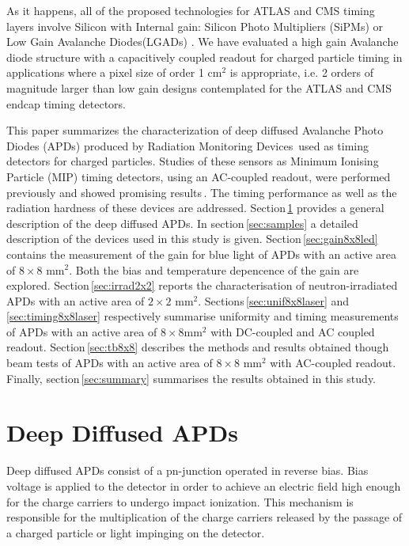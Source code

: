 \documentclass{article}
\begin{document}
As it happens, all of the proposed technologies for ATLAS and CMS timing layers involve Silicon with Internal gain: Silicon Photo Multipliers (SiPMs) or Low Gain Avalanche Diodes(LGADs) \cite{cmsMIPtiming,atlasMIPtiming}. We have evaluated a high gain Avalanche diode structure with a capacitively coupled readout for charged particle timing in applications where a pixel size of order 1 cm$^{2}$ is appropriate, i.e. 2 orders of magnitude larger than low gain designs contemplated for the ATLAS and CMS endcap timing detectors.

This paper summarizes the characterization of deep diffused Avalanche Photo Diodes (APDs) produced by Radiation Monitoring Devices\,\cite{rmdAddress} used as timing detectors for charged particles.
Studies of these sensors as Minimum Ionising Particle (MIP) timing detectors, using an AC-coupled readout, were performed previously and showed promising results\,\cite{white2014}.
The timing performance as well as the radiation hardness of these devices are addressed.
Section\,\ref{sec:ddApds} provides a general description of the deep diffused APDs.
In section\,\ref{sec:samples} a detailed description of the devices used in this study is given.
Section\,\ref{sec:gain8x8led} contains the measurement of the gain for blue light of APDs with an active area of $8 \times 8$ mm$^2$. Both the bias and temperature depencence of the gain are explored.
Section\,\ref{sec:irrad2x2} reports the characterisation of neutron-irradiated APDs with an active area of $2 \times 2$ mm$^2$.
Sections\,\ref{sec:unif8x8laser} and\,\ref{sec:timing8x8laser} respectively summarise uniformity and timing measurements of APDs with an active area of $8 \times 8$mm$^2$ with DC-coupled and AC coupled readout.
Section\,\ref{sec:tb8x8} describes the methods and results obtained though beam tests of APDs with an active area of $8 \times 8$ mm$^2$ with AC-coupled readout.
Finally, section\,\ref{sec:summary} summarises the results obtained in this study.


\section{Deep Diffused APDs}
\label{sec:ddApds}

Deep diffused APDs consist of a pn-junction operated in reverse bias.
Bias voltage is applied to the detector in order to achieve an electric field high enough for the charge carriers to undergo impact ionization.
This mechanism is responsible for the multiplication of the charge carriers released by the passage of a charged particle or light impinging on the detector.
\end{document}
